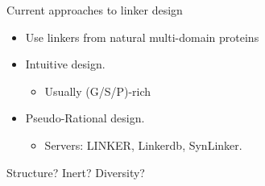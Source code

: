\documentclass{beamer}
\begin{document}
\begin{frame}{Current approaches to linker design}
\begin{itemize}

\item Use linkers from natural multi-domain proteins


\item Intuitive design.
 \begin{itemize}
  \item Usually (G/S/P)-rich 
  \end{itemize}

\item Pseudo-Rational design. 
\begin{itemize}
 \item Servers: LINKER, Linkerdb, SynLinker.
\end{itemize}


\end{itemize}
\vspace{20px}
\LARGE{Structure? Inert? Diversity?}
\end{frame}















\end{document}
